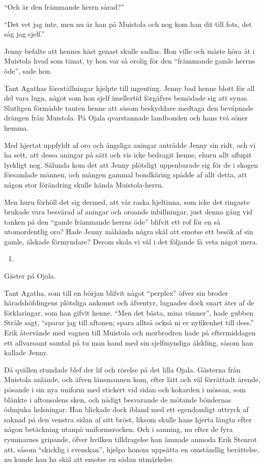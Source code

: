 ``Och är den främmande herrn sårad?''

``Det vet jag inte, men nu är han på Muistola och nog kom han dit till
fots, det såg jag sjelf.''

Jenny befalte att hennes häst genast skulle sadlas. Hon ville och måste
höra åt i Muistola hvad som timat, ty hon var så orolig för den
``främmande gamle herrns öde'', sade hon.

Tant Agathas föreställningar hjelpte till ingenting. Jenny bad henne
blott för all del vara lugn, något som hon sjelf imellertid förgäfves
bemödade sig att synas. Slutligen förmådde tanten henne att såsom
beskyddare medtaga den beväpnade drängen från Muistola. På Ojala
qvarstannade landbonden och hans två söner hemma.

Med hjertat uppfyldt af oro och ängsliga aningar anträdde Jenny sin
ridt, och vi ha sett, att dessa aningar på sätt och vis icke bedragit
henne, ehuru allt aflupit lyckligt nog. Sålunda kom det att Jenny
plötsligt uppenbarade sig för de i skogen församlade männen, och mången
gammal bondkäring spådde af allt detta, att någon stor förändring skulle
hända Muistola-herrn.

Men huru förhöll det sig dermed, att vår raska hjeltinna, som icke det
ringaste brukade vara besvärad af aningar och oroande inbillningar, just
denna gång vid tanken på den ``gamle främmande herrns öde'' blifvit ett
rof för en så utomordentlig oro? Hade Jenny måhända några skäl att
emotse ett besök af sin gamle, älskade förmyndare? Derom skola vi väl i
det följande få veta något mera.

\begin{enumerate}
\def\labelenumi{\arabic{enumi}.}
\setcounter{enumi}{24}
\tightlist
\item
\end{enumerate}

Gäster på Ojala.

Tant Agatha, som till en början blifvit något ``perplex'' öfver sin
broder häradshöfdingens plötsliga ankomst och äfventyr, lugnades dock
snart åter af de förklaringar, som han gifvit henne. ``Men det bästa,
mina vänner'', hade gubben Stråle sagt, ``sparar jag till aftonen; spara
alltså också ni er nyfikenhet till dess.'' Erik återvände med vagnen
till Muistola och morbrodren hade på eftermiddagen ett allvarsamt samtal
på tu man hand med sin sjelfmyndiga älskling, såsom han kallade Jenny.

Då qvällen stundade blef der lif och rörelse på det lilla Ojala.
Gästerna från Muistola anlände, och äfven länsmannen kom, efter lätt och
väl förrättadt ärende, pösande i sin nya uniform med stickert vid sidan
och kokarden i mössan, som blänkte i aftonsolens sken, och nådigt
besvarande de mötande böndernas ödmjuka helsningar. Han blickade dock
ibland med ett egendomligt uttryck af saknad på den venstra sidan af
sitt bröst, liksom skulle hans hjerta längta efter någon betäckning
utanpå uniformsrocken. Och i sanning, nu efter de fyra rymmarnes
gripande, öfver hvilken tilldragelse han ämnade anmoda Erik Stenrot att,
såsom ``skicklig i svenskan'', hjelpa honom uppsätta en omständlig
berättelse, nu kunde han ha skäl att emotse en sådan utmärkelse.

